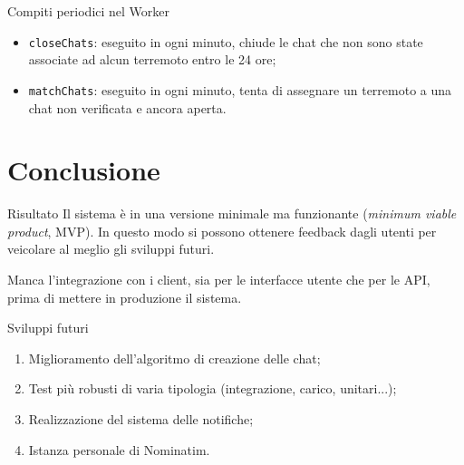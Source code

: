 \documentclass[compress]{beamer}
\begin{document}
\begin{frame}[c]{Compiti periodici nel Worker}
\begin{itemize}
\item \texttt{closeChats}: eseguito in ogni minuto, chiude le chat che non sono state associate ad alcun terremoto entro le 24 ore;
\vspace{1em}
\item \texttt{matchChats}: eseguito in ogni minuto, tenta di assegnare un terremoto a una chat non verificata e ancora aperta.
\end{itemize}
\end{frame}

\section{Conclusione}

\begin{frame}[c]{Risultato}
Il sistema è in una versione minimale ma funzionante (\textit{minimum viable product}, MVP). In questo modo si possono ottenere feedback dagli utenti per veicolare al meglio gli sviluppi futuri.

\vspace{2em}

Manca l'integrazione con i client, sia per le interfacce  utente che per le API, prima di mettere in produzione il sistema.
\end{frame}

\begin{frame}[c]{Sviluppi futuri}
\begin{enumerate}
\item Miglioramento dell'algoritmo di creazione delle chat;
\item Test più robusti di varia tipologia (integrazione, carico, unitari...);
\item Realizzazione del sistema delle notifiche;
\item Istanza personale di Nominatim.
\end{enumerate}
\end{frame}

\end{document}

